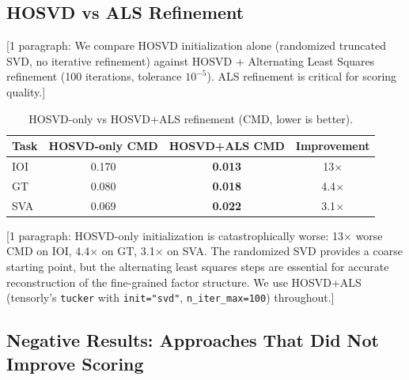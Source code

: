 \documentclass[11pt]{article}
\begin{document}
\subsection{HOSVD vs ALS Refinement}
\label{app:tucker_als}


[1 paragraph: We compare HOSVD initialization alone (randomized truncated
SVD, no iterative refinement) against HOSVD + Alternating Least Squares
refinement (100 iterations, tolerance $10^{-5}$). ALS refinement is
critical for scoring quality.]

\begin{table}[h]
\centering
\caption{HOSVD-only vs HOSVD+ALS refinement (CMD, lower is better).}
\label{tab:tucker_als}
\begin{tabular}{lccc}
\toprule
\textbf{Task} & \textbf{HOSVD-only CMD} & \textbf{HOSVD+ALS CMD} & \textbf{Improvement} \\
\midrule
IOI & 0.170 & \textbf{0.013} & 13$\times$ \\
GT  & 0.080 & \textbf{0.018} & 4.4$\times$ \\
SVA & 0.069 & \textbf{0.022} & 3.1$\times$ \\
\bottomrule
\end{tabular}
\end{table}

[1 paragraph: HOSVD-only initialization is catastrophically worse: 13$\times$
worse CMD on IOI, 4.4$\times$ on GT, 3.1$\times$ on SVA. The randomized
SVD provides a coarse starting point, but the alternating least squares
steps are essential for accurate reconstruction of the fine-grained
factor structure. We use HOSVD+ALS (tensorly's \texttt{tucker} with
\texttt{init="svd"}, \texttt{n\_iter\_max=100}) throughout.]


\subsection{Negative Results: Approaches That Did Not Improve Scoring}
\label{app:tucker_negative}

\end{document}
